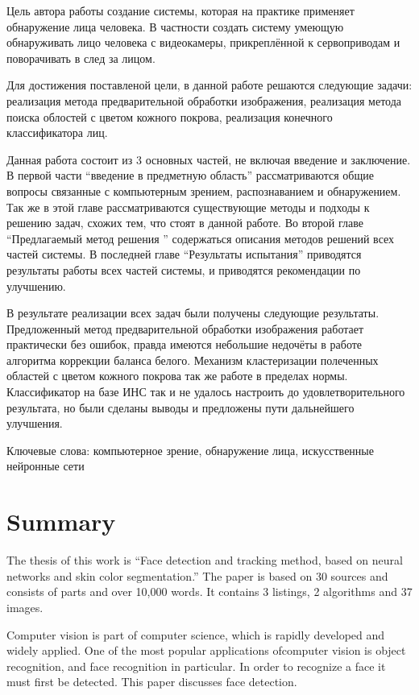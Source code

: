 \documentclass[12pt]{report}
\begin{document}
Цель автора работы создание системы, которая на практике применяет обнаружение лица человека. В частности создать 
систему умеющую обнаруживать лицо человека с видеокамеры, прикреплённой к сервоприводам и поворачивать в след за 
лицом.

Для достижения поставленой цели, в данной работе решаются следующие задачи: реализация метода предварительной обработки изображения, реализация метода поиска облостей с цветом кожного покрова, реализация конечного классификатора лиц.

Данная работа состоит из 3 основных частей, не включая введение и заключение. В первой части ``введение в 
предметную область'' рассматриваются общие вопросы связанные с компьютерным зрением, распознаванием и обнаружением. 
Так же в этой главе рассматриваются существующие методы и подходы к решению задач, схожих тем, что стоят в данной 
работе. Во второй главе ``Предлагаемый метод решения '' содержаться описания методов решений всех частей системы. В 
последней главе ``Результаты испытания'' приводятся результаты работы всех частей системы, и приводятся рекомендации по улучшению.

В результате реализации всех задач были получены следующие результаты. Предложенный метод предварительной обработки изображения работает практически без ошибок, правда имеются небольшие недочёты в работе алгоритма коррекции баланса белого. Механизм кластеризации полеченных областей с цветом кожного покрова так же работе в пределах нормы. Классификатор на базе ИНС так и не удалось настроить до удовлетворительного результата, но были сделаны выводы и предложены пути дальнейшего улучшения.

Ключевые слова: компьютерное зрение, обнаружение лица, искусственные нейронные сети


\chapter*{Summary}
\thispagestyle{fancy}

The thesis of this work is ``Face detection and tracking method, based on neural networks and
skin color segmentation.'' The paper is based on 30 sources and consists of  parts and over 10,000 words. It contains 3 listings, 2 algorithms and 37 images.

Computer vision is part of computer science, which is rapidly developed and widely applied. One of the most popular applications of ​computer vision is object recognition, and face recognition in particular. In order to recognize a face it must first be detected. This paper discusses face detection.
\end{document}
